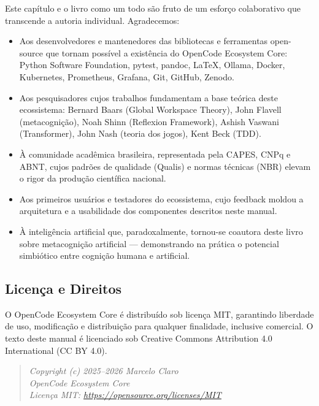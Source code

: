 Este capítulo e o livro como um todo são fruto de um esforço colaborativo que transcende a autoria individual. Agradecemos:

\begin{itemize}
  \item Aos desenvolvedores e mantenedores das bibliotecas e ferramentas open-source que tornam possível a existência do OpenCode Ecosystem Core: Python Software Foundation, pytest, pandoc, LaTeX, Ollama, Docker, Kubernetes, Prometheus, Grafana, Git, GitHub, Zenodo.
  
  \item Aos pesquisadores cujos trabalhos fundamentam a base teórica deste ecossistema: Bernard Baars (Global Workspace Theory), John Flavell (metacognição), Noah Shinn (Reflexion Framework), Ashish Vaswani (Transformer), John Nash (teoria dos jogos), Kent Beck (TDD).
  
  \item À comunidade acadêmica brasileira, representada pela CAPES, CNPq e ABNT, cujos padrões de qualidade (Qualis) e normas técnicas (NBR) elevam o rigor da produção científica nacional.
  
  \item Aos primeiros usuários e testadores do ecossistema, cujo feedback moldou a arquitetura e a usabilidade dos componentes descritos neste manual.
  
  \item À inteligência artificial que, paradoxalmente, tornou-se coautora deste livro sobre metacognição artificial — demonstrando na prática o potencial simbiótico entre cognição humana e artificial.
\end{itemize}

\subsection{Licença e Direitos}

O OpenCode Ecosystem Core é distribuído sob licença MIT, garantindo liberdade de uso, modificação e distribuição para qualquer finalidade, inclusive comercial. O texto deste manual é licenciado sob Creative Commons Attribution 4.0 International (CC BY 4.0).

\begin{quote}
\textit{Copyright (c) 2025--2026 Marcelo Claro}\\
\textit{OpenCode Ecosystem Core}\\
\textit{Licença MIT: \url{https://opensource.org/licenses/MIT}}
\end{quote}


